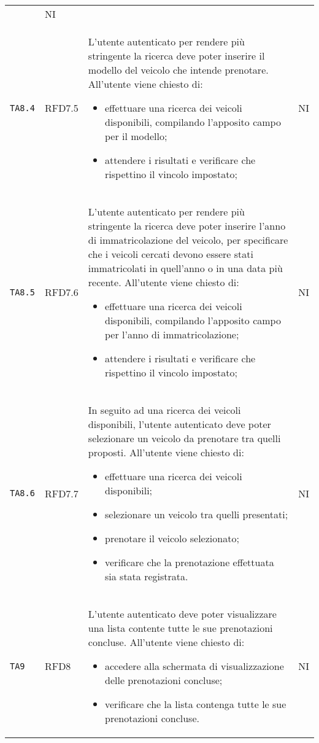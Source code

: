 \begin{longtable}{ >{\centering}p{} >{\centering}p{} >{\centering}p{}
			>{\centering}p{}}
\begin{itemize}
		 \end{itemize}	&	NI	\tabularnewline
		  \texttt{TA8.4}	& RFD7.5 &	L'utente autenticato per rendere più stringente la ricerca deve poter inserire il modello del veicolo che intende prenotare. All'utente viene chiesto di:
		 \begin{itemize}
		 	\item effettuare una ricerca dei veicoli disponibili, compilando l'apposito campo per il modello;
		 	\item attendere i risultati e verificare che rispettino il vincolo impostato;
		 \end{itemize}	&	NI	\tabularnewline
		  \texttt{TA8.5}	& RFD7.6 &	L'utente autenticato per rendere più stringente la ricerca deve poter inserire l'anno di immatricolazione del veicolo, per specificare che i veicoli cercati devono essere stati immatricolati in quell'anno o in una data più recente. All'utente viene chiesto di:
		 \begin{itemize}
		 	\item effettuare una ricerca dei veicoli disponibili, compilando l'apposito campo per l'anno di immatricolazione;
		 	\item attendere i risultati e verificare che rispettino il vincolo impostato;
		 \end{itemize}	&	NI	\tabularnewline
		 \texttt{TA8.6} & RFD7.7 &	In seguito ad una ricerca dei veicoli disponibili, l'utente autenticato deve poter selezionare un veicolo da prenotare tra quelli proposti. All'utente viene chiesto di:
		 \begin{itemize}
		 	\item effettuare una ricerca dei veicoli disponibili;
		 	\item selezionare un veicolo tra quelli presentati;
		 	\item prenotare il veicolo selezionato;
		 	\item verificare che la prenotazione effettuata sia stata registrata.
		 \end{itemize}	&	NI	\tabularnewline
		 
		 \texttt{TA9} &	RFD8 & L'utente autenticato deve poter visualizzare una lista contente tutte le sue prenotazioni concluse. All'utente viene chiesto di:
		 \begin{itemize}
		 	\item accedere alla schermata di visualizzazione delle prenotazioni concluse;
		 	\item verificare che la lista contenga tutte le sue prenotazioni concluse.
		 \end{itemize}	&	NI	\tabularnewline
		 

\end{longtable}
